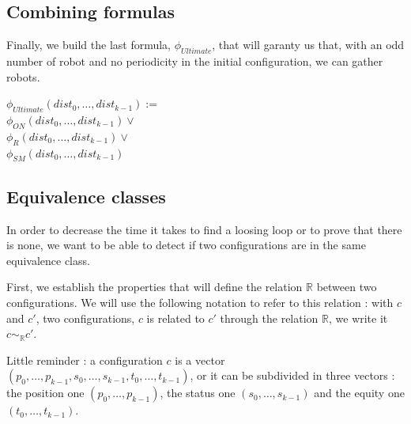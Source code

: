 \documentclass{article}
\begin{document}
\subsection{Combining formulas}

Finally, we build the last formula, $\phi_{Ultimate}$, that will garanty us that, with an odd number of robot and no periodicity in the initial configuration, we can gather robots.

\begin{center}
    
$\phi_{Ultimate}(dist_{0}, \ldots , dist_{k-1}):=$\\
$\phi_{ON}(dist_{0}, \ldots , dist_{k-1}) \lor$\\
$\phi_R(dist_{0}, \ldots , dist_{k-1}) \lor$\\
$\phi_{SM}(dist_{0}, \ldots , dist_{k-1})$
\end{center}

\subsection{Equivalence classes}

In order to decrease the time it takes to find a loosing loop or to prove that there is none, we want to be able to detect if two configurations are in the same equivalence class.

First, we establish the properties that will define the relation $\mathbb{R}$ between two configurations. We will use the following notation to refer to this relation : with $c$ and $c'$, two configurations, $c$ is related to $c'$ through the relation $\mathbb{R}$, we write it $c \sim_{\mathbb{R}} c'$.

Little reminder : a configuration $c$ is a vector $(p_{0}, \dots, p_{k-1}, s_{0}, \dots, s_{k-1}, t_{0}, \dots, t_{k-1})$, or it can be subdivided in three vectors : the position one $(p_{0}, \dots, p_{k-1})$, the status one $(s_{0}, \dots, s_{k-1})$ and the equity one $(t_{0}, \dots, t_{k-1})$.
\end{document}
